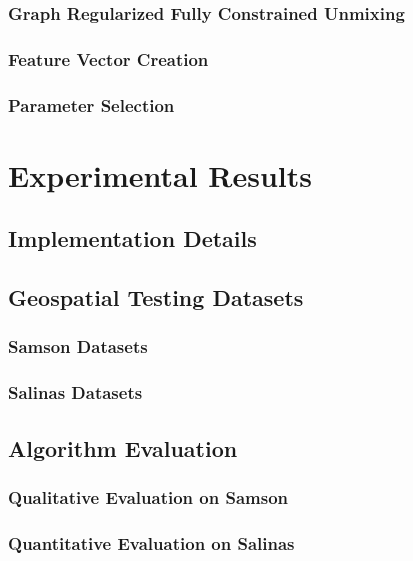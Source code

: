 \documentclass[12pt]{article}
\begin{document}
\subsubsection{Graph Regularized Fully Constrained Unmixing}\label{Algorithm Unmixing}
\subsubsection{Feature Vector Creation}\label{Algorithm FV}
\subsubsection{Parameter Selection}\label{Parameters}

\clearpage
% 
% 
% 
% 
% 
\section{Experimental Results}

\subsection{Implementation Details}

\clearpage
\subsection{Geospatial Testing Datasets}
\subsubsection{Samson Datasets}
\subsubsection{Salinas Datasets}

\clearpage
\subsection{Algorithm Evaluation}
\subsubsection{Qualitative Evaluation on Samson}
\subsubsection{Quantitative Evaluation on Salinas}
\end{document}
